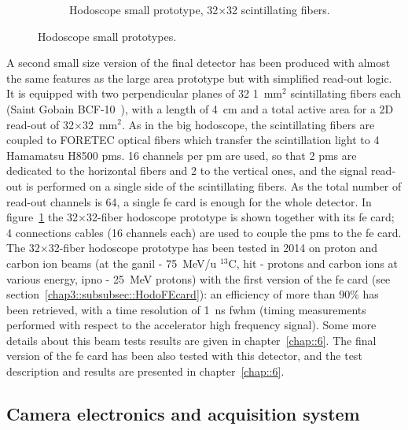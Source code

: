 \begin{figure}
\begin{subfigure}[t]{.5\textwidth}
\caption{Hodoscope small prototype, 32$\times$32 scintillating fibers.}
\label{chap3::fig::Hodoscope32}
\end{subfigure}
\caption{Hodoscope small prototypes.}
\label{chap3::fig::HodoSmall}
\end{figure}

A second small size version of the final detector has been produced with almost the same features as the large area prototype but with simplified read-out logic. It is equipped with two perpendicular planes of 32 1~mm$^{2}$ scintillating fibers each (Saint Gobain BCF-10~\parencite{SaintGobain2017}), with a length of 4~cm and a total active area for a 2D read-out of 32$\times$32~mm$^{2}$. As in the big hodoscope, the scintillating fibers are coupled to FORETEC optical fibers which transfer the scintillation light to 4 Hamamatsu H8500 \glspl{pm}. 16 channels per \gls{pm} are used, so that 2 \glspl{pm} are dedicated to the horizontal fibers and 2 to the vertical ones, and the signal read-out is performed on a single side of the scintillating fibers. As the total number of read-out channels is 64, a single \gls{fe} card is enough for the whole detector. In figure~\ref{chap3::fig::Hodoscope32} the 32$\times$32-fiber hodoscope prototype is shown together with its \gls{fe} card; 4 connections cables (16 channels each) are used to couple the \glspl{pm} to the \gls{fe} card.\\
The 32$\times$32-fiber hodoscope prototype has been tested in 2014 on proton and carbon ion beams (at the \gls{ganil} - 75~MeV/u $^{13}$C, \gls{hit} - protons and carbon ions at various energy, \gls{ipno} - 25~MeV protons) with the first version of the \gls{fe} card (see section~\ref{chap3::subsubsec::HodoFEcard}): an efficiency of more than 90\% has been retrieved, with a time resolution of 1~ns \gls{fwhm} (timing measurements performed with respect to the accelerator high frequency signal). Some more details about this beam tests results are given in chapter~\ref{chap::6}. The final version of the \gls{fe} card has been also tested with this detector, and the test description and results are presented in chapter~\ref{chap::6}.  
   


\subsection{Camera electronics and acquisition system}\label{chap3::subsec::cameraElectronicsDAQ}

